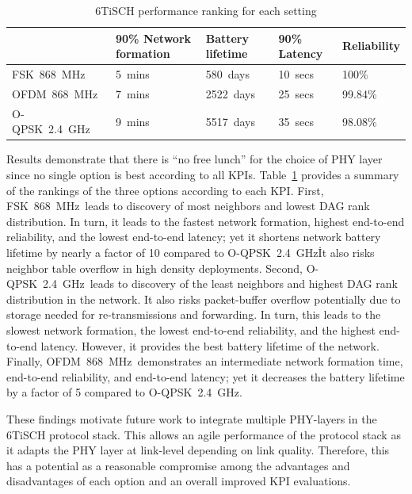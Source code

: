 \documentclass[sensors,article,submit,moreauthors,pdftex]{Definitions/mdpi}
\newcommand{\fsk}          {FSK~868~MHz}
\newcommand{\oqpsk}        {O-QPSK~2.4~GHz}
\newcommand{\ofdm}         {OFDM~868~MHz}
\begin{document}
\begin{table}
    \centering
    \begin{tabular}{|l|l|l|l|l|}
        \hline
                & 90\% Network formation & Battery lifetime & 90\% Latency  &  Reliability   \\ \hline
        \fsk\   & 5~mins                 & 580~days      & 10~secs       & 100\%             \\ \hline
        \ofdm\  & 7~mins                 & 2522~days     & 25~secs       & 99.84\%           \\ \hline
        \oqpsk\ & 9~mins                 & 5517~days     & 35~secs       & 98.08\%           \\ \hline
    \end{tabular}
    \caption{6TiSCH performance ranking for each setting}
    \label{tab:summary}
\end{table}


Results demonstrate that there is ``no free lunch'' for the choice of PHY layer since no single option is best according to all KPIs.
Table~\ref{tab:summary} provides a summary of the rankings of the three options according to each KPI.
First, \fsk\ leads to discovery of most neighbors and lowest DAG rank distribution.
In turn, it leads to the fastest network formation, highest end-to-end reliability, and the lowest end-to-end latency; yet it shortens network battery lifetime by nearly a factor of 10 compared to \oqpsk\. 
It also risks neighbor table overflow in high density deployments.
Second, \oqpsk\ leads to discovery of the least neighbors and highest DAG rank distribution in the network.
It also risks packet-buffer overflow potentially due to storage needed for re-transmissions and forwarding.
In turn, this leads to the slowest network formation, the lowest end-to-end reliability, and the highest end-to-end latency.
However, it provides the best battery lifetime of the network. 
Finally, \ofdm\ demonstrates an intermediate network formation time, end-to-end reliability, and end-to-end latency; yet  it decreases the battery lifetime by a factor of 5 compared to \oqpsk.


These findings motivate future work to integrate multiple PHY-layers in the 6TiSCH protocol stack.
This allows an agile performance of the protocol stack as it adapts the PHY layer at link-level depending on link quality.
Therefore, this has a potential as a reasonable compromise among the advantages and disadvantages of each option and an overall improved KPI evaluations. 

% 

\end{document}
